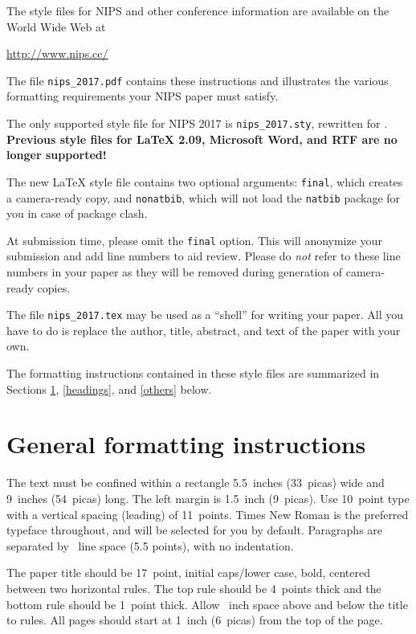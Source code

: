 \documentclass{article}
\begin{document}
The style files for NIPS and other conference information are
available on the World Wide Web at
\begin{center}
  \url{http://www.nips.cc/}
\end{center}
The file \verb+nips_2017.pdf+ contains these instructions and
illustrates the various formatting requirements your NIPS paper must
satisfy.

The only supported style file for NIPS 2017 is \verb+nips_2017.sty+,
rewritten for \LaTeXe{}.  \textbf{Previous style files for \LaTeX{}
  2.09, Microsoft Word, and RTF are no longer supported!}

The new \LaTeX{} style file contains two optional arguments:
\verb+final+, which creates a camera-ready copy, and \verb+nonatbib+,
which will not load the \verb+natbib+ package for you in case of
package clash.

At submission time, please omit the \verb+final+ option. This will
anonymize your submission and add line numbers to aid review.  Please
do \emph{not} refer to these line numbers in your paper as they will
be removed during generation of camera-ready copies.

The file \verb+nips_2017.tex+ may be used as a ``shell'' for writing
your paper. All you have to do is replace the author, title, abstract,
and text of the paper with your own.

The formatting instructions contained in these style files are
summarized in Sections \ref{gen_inst}, \ref{headings}, and
\ref{others} below.

\section{General formatting instructions}
\label{gen_inst}

The text must be confined within a rectangle 5.5~inches (33~picas)
wide and 9~inches (54~picas) long. The left margin is 1.5~inch
(9~picas).  Use 10~point type with a vertical spacing (leading) of
11~points.  Times New Roman is the preferred typeface throughout, and
will be selected for you by default.  Paragraphs are separated by
~line space (5.5 points), with no indentation.

The paper title should be 17~point, initial caps/lower case, bold,
centered between two horizontal rules. The top rule should be 4~points
thick and the bottom rule should be 1~point thick. Allow
~inch space above and below the title to rules. All
pages should start at 1~inch (6~picas) from the top of the page.
\end{document}
